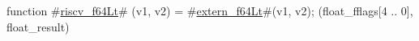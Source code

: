 function #\hyperref[sailRISCVzriscvzyf64Lt]{riscv\_f64Lt}# (v1, v2) = {
  #\hyperref[sailRISCVzexternzyf64Lt]{extern\_f64Lt}#(v1, v2);
  (float_fflags[4 .. 0], float_result)
}
